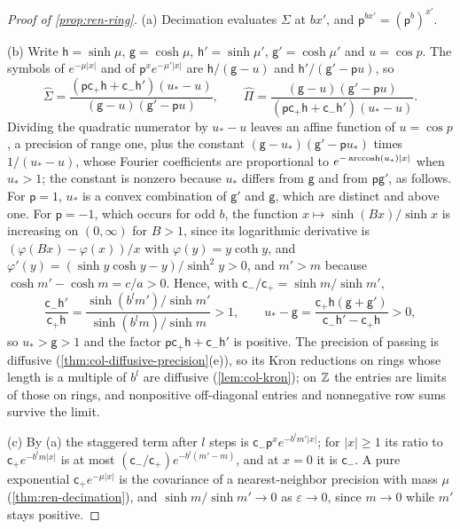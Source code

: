 \begin{proof}[Proof of \cref{prop:ren-ring}]
(a) Decimation evaluates $\Sigma$ at $bx'$, and $\mathsf p^{bx'}=(\mathsf p^b)^{x'}$.

(b) Write $\mathsf h=\sinh\mu$, $\mathsf g=\cosh\mu$, $\mathsf h'=\sinh\mu'$, $\mathsf g'=\cosh\mu'$ and $u=\cos p$. The symbols of $e^{-\mu\lvert x\rvert}$ and of $\mathsf p^xe^{-\mu'\lvert x\rvert}$ are $\mathsf h/(\mathsf g-u)$ and $\mathsf h'/(\mathsf g'-\mathsf pu)$, so
\[
\hat\Sigma=\frac{(\mathsf p\mathsf c_+\mathsf h+\mathsf c_-\mathsf h')(u_\ast-u)}{(\mathsf g-u)(\mathsf g'-\mathsf pu)},\qquad\hat\Pi=\frac{(\mathsf g-u)(\mathsf g'-\mathsf pu)}{(\mathsf p\mathsf c_+\mathsf h+\mathsf c_-\mathsf h')(u_\ast-u)}.
\]
Dividing the quadratic numerator by $u_\ast-u$ leaves an affine function of $u=\cos p$, a precision of range one, plus the constant $(\mathsf g-u_\ast)(\mathsf g'-\mathsf pu_\ast)$ times $1/(u_\ast-u)$, whose Fourier coefficients are proportional to $e^{-\operatorname{arccosh}(u_\ast)\lvert x\rvert}$ when $u_\ast>1$; the constant is nonzero because $u_\ast$ differs from $\mathsf g$ and from $\mathsf p\mathsf g'$, as follows. For $\mathsf p=1$, $u_\ast$ is a convex combination of $\mathsf g'$ and $\mathsf g$, which are distinct and above one. For $\mathsf p=-1$, which occurs for odd $b$, the function $x\mapsto\sinh(Bx)/\sinh x$ is increasing on $(0,\infty)$ for $B>1$, since its logarithmic derivative is $(\varphi(Bx)-\varphi(x))/x$ with $\varphi(y)=y\coth y$, and $\varphi'(y)=(\sinh y\cosh y-y)/\sinh^2y>0$, and $m'>m$ because $\cosh m'-\cosh m=c/a>0$. Hence, with $\mathsf c_-/\mathsf c_+=\sinh m/\sinh m'$,
\[
\frac{\mathsf c_-\mathsf h'}{\mathsf c_+\mathsf h}=\frac{\sinh(b^lm')/\sinh m'}{\sinh(b^lm)/\sinh m}>1,\qquad u_\ast-\mathsf g=\frac{\mathsf c_+\mathsf h(\mathsf g+\mathsf g')}{\mathsf c_-\mathsf h'-\mathsf c_+\mathsf h}>0,
\]
so $u_\ast>\mathsf g>1$ and the factor $\mathsf p\mathsf c_+\mathsf h+\mathsf c_-\mathsf h'$ is positive. The precision of passing is diffusive (\cref{thm:col-diffusive-precision}(e)), so its Kron reductions on rings whose length is a multiple of $b^l$ are diffusive (\cref{lem:col-kron}); on $\mathbb{Z}$ the entries are limits of those on rings, and nonpositive off-diagonal entries and nonnegative row sums survive the limit.

(c) By (a) the staggered term after $l$ steps is $\mathsf c_-\mathsf p^xe^{-b^lm'\lvert x\rvert}$; for $\lvert x\rvert\ge1$ its ratio to $\mathsf c_+e^{-b^lm\lvert x\rvert}$ is at most $(\mathsf c_-/\mathsf c_+)e^{-b^l(m'-m)}$, and at $x=0$ it is $\mathsf c_-$. A pure exponential $\mathsf c_+e^{-\mu\lvert x\rvert}$ is the covariance of a nearest-neighbor precision with mass $\mu$ (\cref{thm:ren-decimation}), and $\sinh m/\sinh m'\to0$ as $\varepsilon\to0$, since $m\to0$ while $m'$ stays positive.
\end{proof}

